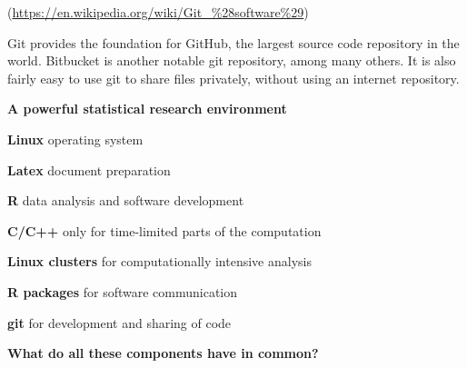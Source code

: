 \documentclass[portrait,11pt]{seminar}
\begin{document}
(\url{https://en.wikipedia.org/wiki/Git_%28software%29})

Git provides the foundation for GitHub, the largest source code repository in the world.  Bitbucket is another notable git repository, among many others. It is also fairly easy to use git to share files privately, without using an internet repository.

\es

\bs
{\bf A powerful statistical research environment}

{\bf Linux} operating system

{\bf Latex} document preparation

{\bf R} data analysis and software development

{\bf C/C++} only for time-limited parts of the computation

{\bf Linux clusters} for computationally intensive analysis

{\bf R packages} for software communication

{\bf git} for development and sharing of code

\medskip

{\bf What do all these components have in common?}

\es
\end{document}
